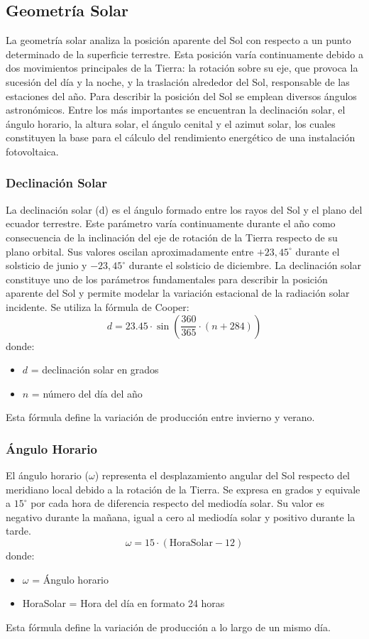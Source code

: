 \documentclass[12pt, a4paper]{article}
\begin{document}
\subsection{Geometría Solar}
La geometría solar analiza la posición aparente del Sol con respecto a un punto determinado de la superficie terrestre. Esta posición varía continuamente debido a dos movimientos principales de la Tierra: la rotación sobre su eje, que provoca la sucesión del día y la noche, y la traslación alrededor del Sol, responsable de las estaciones del año.
Para describir la posición del Sol se emplean diversos ángulos astronómicos. Entre los más importantes se encuentran la declinación solar, el ángulo horario, la altura solar, el ángulo cenital y el azimut solar, los cuales constituyen la base para el cálculo del rendimiento energético de una instalación fotovoltaica.

\subsubsection{Declinación Solar}
La declinación solar (d) es el ángulo formado entre los rayos del Sol y el plano del ecuador terrestre. Este parámetro varía continuamente durante el año como consecuencia de la inclinación del eje de rotación de la Tierra respecto de su plano orbital. Sus valores oscilan aproximadamente entre $+23,45^\circ$ durante el solsticio de junio y $-23,45^\circ$ durante el solsticio de diciembre. La declinación solar constituye uno de los parámetros fundamentales para describir la posición aparente del Sol y permite modelar la variación estacional de la radiación solar incidente. Se utiliza la fórmula de Cooper:
\[ d = 23.45 \cdot \sin\left(\frac{360}{365} \cdot (n + 284)\right) \]
donde:
\begin{itemize}
    \item $d$ = declinación solar en grados
    \item $n$ = número del día del año
\end{itemize}
Esta fórmula define la variación de producción entre invierno y verano.

\subsubsection{Ángulo Horario}
El ángulo horario ($\omega$) representa el desplazamiento angular del Sol respecto del meridiano local debido a la rotación de la Tierra. Se expresa en grados y equivale a $15^\circ$ por cada hora de diferencia respecto del mediodía solar. Su valor es negativo durante la mañana, igual a cero al mediodía solar y positivo durante la tarde.
\[ \omega = 15 \cdot (\text{HoraSolar} - 12) \]
donde:
\begin{itemize}
    \item $\omega$ = Ángulo horario
    \item HoraSolar = Hora del día en formato 24 horas
\end{itemize}
Esta fórmula define la variación de producción a lo largo de un mismo día.
\end{document}
